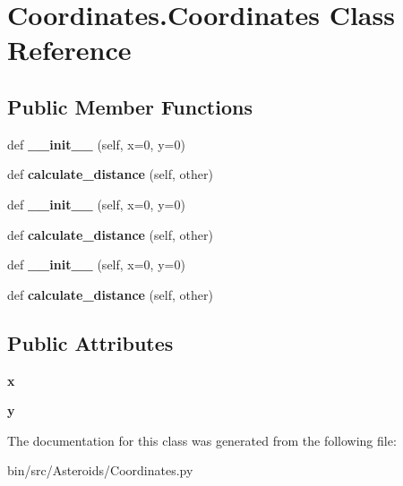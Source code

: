 \hypertarget{classCoordinates_1_1Coordinates}{}\section{Coordinates.\+Coordinates Class Reference}
\label{classCoordinates_1_1Coordinates}
\subsection*{Public Member Functions}
\begin{DoxyCompactItemize}
\item 
def {\bfseries \+\_\+\+\_\+init\+\_\+\+\_\+} (self, x=0, y=0)\hypertarget{classCoordinates_1_1Coordinates_a5ac43924c43e9785be8589b8a8332da2}{}\label{classCoordinates_1_1Coordinates_a5ac43924c43e9785be8589b8a8332da2}

\item 
def {\bfseries calculate\+\_\+distance} (self, other)\hypertarget{classCoordinates_1_1Coordinates_a9a095550405cda8a1ddeaf52c92132c8}{}\label{classCoordinates_1_1Coordinates_a9a095550405cda8a1ddeaf52c92132c8}

\item 
def {\bfseries \+\_\+\+\_\+init\+\_\+\+\_\+} (self, x=0, y=0)\hypertarget{classCoordinates_1_1Coordinates_a5ac43924c43e9785be8589b8a8332da2}{}\label{classCoordinates_1_1Coordinates_a5ac43924c43e9785be8589b8a8332da2}

\item 
def {\bfseries calculate\+\_\+distance} (self, other)\hypertarget{classCoordinates_1_1Coordinates_a9a095550405cda8a1ddeaf52c92132c8}{}\label{classCoordinates_1_1Coordinates_a9a095550405cda8a1ddeaf52c92132c8}

\item 
def {\bfseries \+\_\+\+\_\+init\+\_\+\+\_\+} (self, x=0, y=0)\hypertarget{classCoordinates_1_1Coordinates_a5ac43924c43e9785be8589b8a8332da2}{}\label{classCoordinates_1_1Coordinates_a5ac43924c43e9785be8589b8a8332da2}

\item 
def {\bfseries calculate\+\_\+distance} (self, other)\hypertarget{classCoordinates_1_1Coordinates_a9a095550405cda8a1ddeaf52c92132c8}{}\label{classCoordinates_1_1Coordinates_a9a095550405cda8a1ddeaf52c92132c8}

\end{DoxyCompactItemize}
\subsection*{Public Attributes}
\begin{DoxyCompactItemize}
\item 
{\bfseries x}\hypertarget{classCoordinates_1_1Coordinates_a3aba78cfc8f0666027e7573edc372b7c}{}\label{classCoordinates_1_1Coordinates_a3aba78cfc8f0666027e7573edc372b7c}

\item 
{\bfseries y}\hypertarget{classCoordinates_1_1Coordinates_a4f539bd171f295556d6cbd8224d66019}{}\label{classCoordinates_1_1Coordinates_a4f539bd171f295556d6cbd8224d66019}

\end{DoxyCompactItemize}


The documentation for this class was generated from the following file\+:\begin{DoxyCompactItemize}
\item 
bin/src/\+Asteroids/Coordinates.\+py\end{DoxyCompactItemize}
